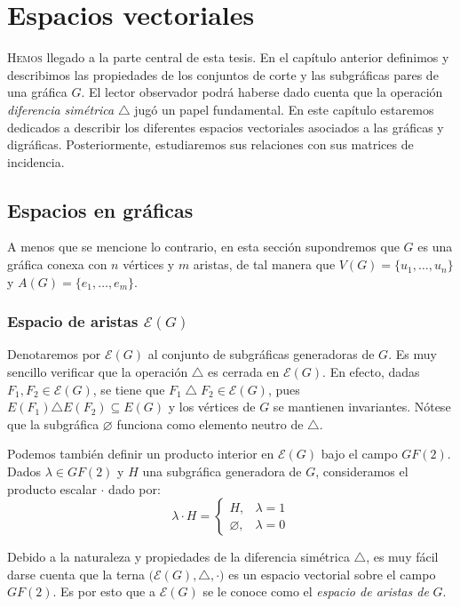 \chapter{Espacios vectoriales}

\lettrine[lines=6] {\initfamily \selectfont H} {emos} llegado a la parte central de esta tesis. En el capítulo anterior definimos y describimos las propiedades de los conjuntos de corte y las subgráficas pares de una gráfica $G$. El lector observador podrá haberse dado cuenta que la operación \textit{diferencia simétrica} $\triangle$ jugó un papel fundamental. En este capítulo estaremos dedicados a describir los diferentes espacios vectoriales asociados a las gráficas y digráficas. Posteriormente, estudiaremos sus relaciones con sus matrices de incidencia.

\section{Espacios en gráficas}
A menos que se mencione lo contrario, en esta sección supondremos que $G$ es una gráfica conexa con $n$ vértices y $m$ aristas, de tal manera que $V(G)=\{u_{1}, \ldots, u_{n}\}$ y $A(G) = \{e_{1}, \ldots, e_{m}\}$.

\subsection{Espacio de aristas $\mathcal{E}(G)$}
Denotaremos por $\mathcal{E}(G)$ al conjunto de subgráficas generadoras de $G$.
Es muy sencillo verificar que la operación $\triangle$ es cerrada en $\mathcal{E}(G)$. En efecto, dadas $F_{1}, F_{2} \in \mathcal{E}(G)$, se tiene que  $F_{1} \bigtriangleup F_{2} \in \mathcal{E}(G)$, pues $E(F_{1}) \triangle E(F_{2}) \subseteq E(G)$ y los vértices de $G$ se mantienen invariantes. Nótese que la subgráfica $\varnothing$ funciona como elemento neutro de $\triangle$.

Podemos también definir un producto interior en $\mathcal{E}(G)$ bajo el campo $GF(2)$. Dados $\lambda \in GF(2)$ y $H$ una subgráfica generadora de $G$, consideramos el producto escalar $\cdot$ dado por:
$$
\lambda \cdot H =\left\{\begin{matrix}
H, & \lambda = 1  \\
\varnothing, & \lambda = 0
\end{matrix}\right.
$$

    Debido a la naturaleza y propiedades de la diferencia simétrica $\triangle$, es muy fácil darse cuenta que la terna $\Big(\mathcal{E}(G), \triangle, \cdot\Big)$ es un espacio vectorial sobre el campo $GF(2)$. Es por esto que a $\mathcal{E}(G)$ se le conoce como el \textit{espacio de aristas de} $G$. 


